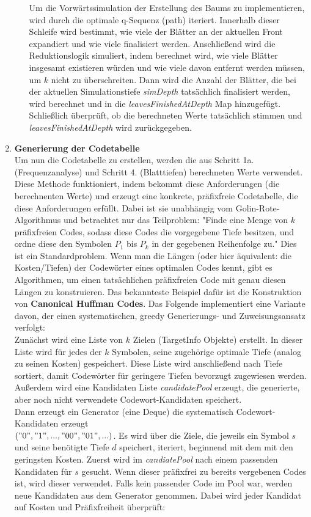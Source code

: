 \documentclass[a4paper,10pt,ngerman]{scrartcl}
\begin{document}
\begin{enumerate}
\begin{enumerate}
    Um die Vorwärtssimulation der Erstellung des Baums zu implementieren, wird durch die optimale q-Sequenz (path) iteriert. Innerhalb dieser Schleife wird bestimmt, wie viele der Blätter an der aktuellen Front expandiert und wie viele finalisiert werden. Anschließend wird die Reduktionslogik simuliert, indem berechnet wird, wie viele Blätter insgesamt existieren würden und wie viele davon entfernt werden müssen, um $k$ nicht zu überschreiten. Dann wird die Anzahl der Blätter, die bei der aktuellen Simulationstiefe \textit{simDepth} tatsächlich finalisiert werden, wird berechnet und in die \textit{leavesFinishedAtDepth} Map hinzugefügt. Schließlich überprüft, ob die berechneten Werte tatsächlich stimmen und \textit{leavesFinishedAtDepth} wird zurückgegeben.  
  \end{enumerate}
  \item \textbf{Generierung der Codetabelle}\\
  Um nun die Codetabelle zu erstellen, werden die aus Schritt 1a. (Frequenzanalyse) und Schritt 4. (Blatttiefen) berechneten Werte verwendet. Diese Methode funktioniert, indem bekommt diese Anforderungen (die berechnenten Werte) und erzeugt eine konkrete, präfixfreie Codetabelle, die diese Anforderungen erfüllt. Dabei ist sie unabhängig vom Golin-Rote-Algorithmus und betrachtet nur das Teilproblem: "Finde eine Menge von $k$ präfixfreien Codes, sodass diese Codes die vorgegebene Tiefe besitzen, und ordne diese den Symbolen $P_1$ bis $P_k$ in der gegebenen Reihenfolge zu." Dies ist ein Standardproblem. Wenn man die Längen (oder hier äquivalent: die Kosten/Tiefen) der Codewörter eines optimalen Codes kennt, gibt es Algorithmen, um einen tatsächlichen präfixfreien Code mit genau diesen Längen zu konstruieren. Das bekannteste Beispiel dafür ist die Konstruktion von \textbf{Canonical Huffman Codes}. Das Folgende implementiert eine Variante davon, der einen systematischen, greedy Generierungs- und Zuweisungsansatz verfolgt: 
  \\\newline
  Zunächst wird eine Liste von $k$ Zielen (TargetInfo Objekte) erstellt. In dieser Liste wird für jedes der $k$ Symbolen, seine zugehörige optimale Tiefe (analog zu seinen Kosten) gespeichert. Diese Liste wird anschließend nach Tiefe sortiert, damit Codewörter für geringere Tiefen bevorzugt zugewiesen werden. Außerdem wird eine Kandidaten Liste \textit{candidatePool} erzeugt, die generierte, aber noch nicht verwendete Codewort-Kandidaten speichert. \\
  Dann erzeugt ein Generator (eine Deque) die systematisch Codewort-Kandidaten erzeugt\\ $("0", "1", ..., "00", "01", ...)$. Es wird über die Ziele, die jeweils ein Symbol $s$ und seine benötigte Tiefe $d$ speichert, iteriert, beginnend mit dem mit den geringsten Kosten. Zuerst wird im \textit{candiatePool} nach einem passenden Kandidaten für $s$ gesucht. Wenn dieser präfixfrei zu bereits vergebenen Codes ist, wird dieser verwendet. Falls kein passender Code im Pool war, werden neue Kandidaten aus dem Generator genommen. Dabei wird jeder Kandidat auf Kosten und Präfixfreiheit überprüft: 

\end{enumerate}
\end{document}
